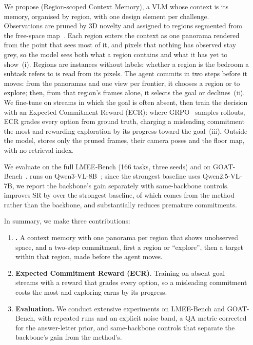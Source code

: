 We propose \ours{} (Region-scoped Context Memory), a VLM whose context is its
memory, organised by region, with one design element per challenge. Observations
are pruned by 3D novelty and assigned to regions segmented from the free-space
map~\cite{bormann2016room}. Each region enters the context as one panorama
rendered from the point that sees most of it, and pixels that nothing has
observed stay grey, so the model sees both what a region contains and what it
has yet to show~(i). Regions are instances without labels: whether a region is
the bedroom a subtask refers to is read from its pixels. The agent commits in
two steps before it moves: from the panoramas and one view per frontier, it
chooses a region or to explore; then, from that region's frames alone, it
selects the goal or declines~(ii).
We fine-tune \ours{} on streams in which the goal is often absent, then train
the decision with an Expected Commitment Reward (ECR): where
GRPO~\cite{deepseekmath} samples rollouts, ECR grades every option from ground
truth, charging a misleading commitment the most and rewarding exploration by
its progress toward the goal~(iii). Outside the model, \ours{} stores only the
pruned frames, their camera poses and the floor map, with no retrieval index.

We evaluate on the full LMEE-Bench (166 tasks, three seeds) and on
GOAT-Bench~\cite{goatbench}. \ours{} runs on Qwen3-VL-8B~\cite{qwen3vl}; since
the strongest baseline uses Qwen2.5-VL-7B, we report the backbone's gain
separately with same-backbone controls. \ours{} improves SR by  over
the strongest baseline,  of which comes from the method rather than
the backbone, and substantially reduces premature commitments.

\noindent In summary, we make three contributions:
\begin{enumerate}
  \setlength{\itemsep}{1pt}
  \item \textbf{\ours.} A context memory with one panorama per region that
    shows unobserved space, and a two-step commitment, first a region or
    ``explore'', then a target within that region, made before the agent moves.
  \item \textbf{Expected Commitment Reward (ECR).} Training on absent-goal
    streams with a reward that grades every option, so a misleading commitment
    costs the most and exploring earns by its progress.
  \item \textbf{Evaluation.} We conduct extensive experiments on LMEE-Bench and
    GOAT-Bench, with repeated runs and an explicit noise band, a QA metric
    corrected for the answer-letter prior, and same-backbone controls that
    separate the backbone's gain from the method's.
\end{enumerate}
